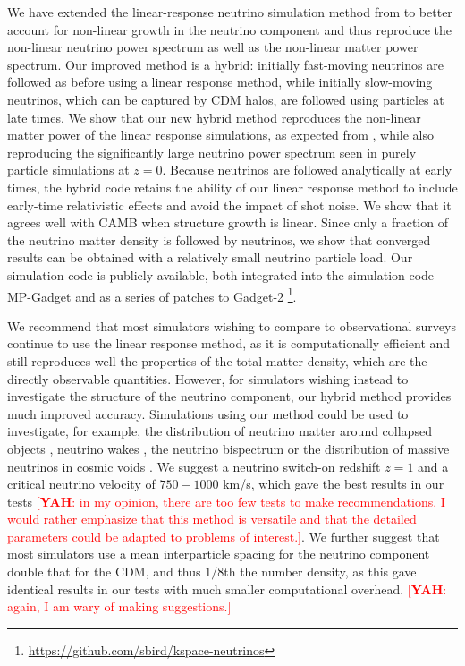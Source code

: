 \documentclass[useAMS, usenatbib]{mnras}
\newcommand{\yah}[1]{{\textcolor{red}{[{\bf YAH}: #1]}}}
\begin{document}
We have extended the linear-response neutrino simulation method from \cite{AHB} to better account for non-linear growth in the neutrino component and thus reproduce the non-linear neutrino power spectrum as well as the non-linear matter power spectrum. 
Our improved method is a hybrid: initially fast-moving neutrinos are followed as before using a linear response method, while initially slow-moving neutrinos, which can be captured by CDM halos, are followed using particles at late times. We show that our new hybrid method reproduces the non-linear matter power of the linear response simulations, as expected from \cite{AHB}, while also reproducing the significantly large neutrino power spectrum seen in purely particle simulations at $z=0$. Because neutrinos are followed analytically at early times, the hybrid code retains the ability of our linear response method to include early-time relativistic effects and avoid the impact of shot noise. We show that it agrees well with CAMB when structure growth is linear. Since only a fraction of the neutrino matter density is followed by neutrinos, we show that converged results can be obtained with a relatively small neutrino particle load. Our simulation code is publicly available, both integrated into the simulation code MP-Gadget and as a series of patches to Gadget-2 \footnote{\url{https://github.com/sbird/kspace-neutrinos}}.

We recommend that most simulators wishing to compare to observational surveys continue to use the linear response method, as it is computationally efficient and still reproduces well the properties of the total matter density, which are the directly observable quantities. However, for simulators wishing instead to investigate the structure of the neutrino component, our hybrid method provides much improved accuracy. Simulations using our method could be used to investigate, for example, the distribution of neutrino matter around collapsed objects \citep{FVN_2013}, neutrino wakes \citep{Inman_2015}, the neutrino bispectrum \citep{Furhrer_2015} or the distribution of massive neutrinos in cosmic voids \citep{Banerjee_2016}. We suggest a neutrino switch-on redshift $z=1$ and a critical neutrino velocity of $750-1000$ km/s, which gave the best results in our tests \yah{in my opinion, there are too few tests to make recommendations. I would rather emphasize that this method is versatile and that the detailed parameters could be adapted to problems of interest.}. We further suggest that most simulators use a mean interparticle spacing for the neutrino component double that for the CDM, and thus $1/8$th the number density, as this gave identical results in our tests with much smaller computational overhead. \yah{again, I am wary of making suggestions.}
\end{document}
